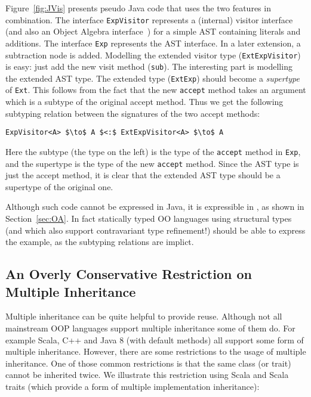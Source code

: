 Figure~\ref{fig:JVis} presents pseudo Java code that uses the two
features in combination. The interface \lstinline{ExpVisitor}
represents a (internal) visitor interface (and also an Object Algebra
interface~\cite{}) for a simple AST containing literals and
additions. The interface \lstinline{Exp} represents the AST interface.
In a later extension, a subtraction node is added. Modelling the
extended visitor type (\lstinline{ExtExpVisitor}) is easy: just add
the new visit method (\lstinline{sub}). The interesting part is
modelling the extended AST type. The extended type
(\lstinline{ExtExp}) should become a \emph{supertype} of
\lstinline{Ext}. This follows from the fact that the new
\lstinline{accept} method takes an argument which is a subtype of the
original accept method. Thus we get the following subtyping relation
between the signatures of the two accept methods:

\begin{lstlisting}[mathescape=true]
ExpVisitor<A> $\to$ A $<:$ ExtExpVisitor<A> $\to$ A
\end{lstlisting}

\noindent Here the subtype (the type on the left) is the type of the
\lstinline{accept} method in \lstinline{Exp}, and the supertype is the type of
the new \lstinline{accept} method. Since the AST type is just the
accept method, it is clear that the extended AST type should be a
supertype of the original one. 

Although such code cannot be expressed in Java, it is expressible in
\name, as shown in Section~\ref{sec:OA}. In fact statically typed
OO languages using structural types (and which also support
contravariant type refinement!) should be able to express 
the example, as the subtyping relations are implict. 

\subsection{An Overly Conservative Restriction on Multiple Inheritance}

Multiple inheritance can be quite helpful to provide reuse. 
Although not all mainstream OOP languages support multiple
inheritance some of them do. For example Scala, C++ and Java 8
(with default methods) all support some form of multiple inheritance. 
However, there are some restrictions to the usage of multiple
inheritance. One of those common restrictions is that the same class (or trait)
cannot be inherited twice. We illustrate this restriction using Scala
and Scala traits (which provide a form of multiple implementation inheritance):

